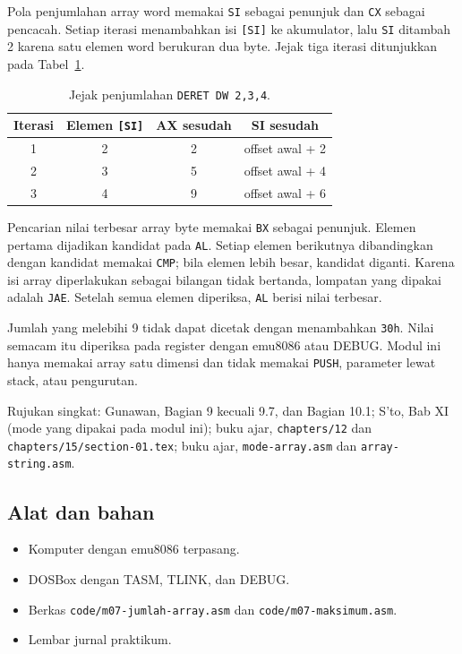 Pola penjumlahan array word memakai \texttt{SI} sebagai penunjuk dan
\texttt{CX} sebagai pencacah. Setiap iterasi menambahkan isi
\texttt{[SI]} ke akumulator, lalu \texttt{SI} ditambah 2 karena satu
elemen word berukuran dua byte. Jejak tiga iterasi ditunjukkan pada
Tabel~\ref{tab:m07-jejak}.

\begin{table}[H]
    \centering
    \caption{Jejak penjumlahan \texttt{DERET DW 2,3,4}.}
    \label{tab:m07-jejak}
    \small
    \begin{tabular}{@{}cccc@{}}
        \toprule
        \textbf{Iterasi} & \textbf{Elemen \texttt{[SI]}} &
        \textbf{AX sesudah} & \textbf{SI sesudah} \\
        \midrule
        1 & 2 & 2 & offset awal + 2 \\
        2 & 3 & 5 & offset awal + 4 \\
        3 & 4 & 9 & offset awal + 6 \\
        \bottomrule
    \end{tabular}
\end{table}

Pencarian nilai terbesar array byte memakai \texttt{BX} sebagai
penunjuk. Elemen pertama dijadikan kandidat pada \texttt{AL}. Setiap
elemen berikutnya dibandingkan dengan kandidat memakai
\texttt{CMP}; bila elemen lebih besar, kandidat diganti. Karena isi
array diperlakukan sebagai bilangan tidak bertanda, lompatan yang
dipakai adalah \texttt{JAE}. Setelah semua elemen diperiksa,
\texttt{AL} berisi nilai terbesar.

Jumlah yang melebihi 9 tidak dapat dicetak dengan menambahkan
\texttt{30h}. Nilai semacam itu diperiksa pada register dengan
emu8086 atau DEBUG. Modul ini hanya memakai array satu dimensi dan
tidak memakai \texttt{PUSH}, parameter lewat stack, atau pengurutan.

\begin{rujukan}
Rujukan singkat: Gunawan, Bagian 9 kecuali 9.7, dan Bagian 10.1;
S'to, Bab XI (mode yang dipakai pada modul ini); buku ajar,
\texttt{chapters/12} dan \texttt{chapters/15/section-01.tex};
buku ajar, \texttt{mode-array.asm} dan \texttt{array-string.asm}.
\end{rujukan}

\subsection{Alat dan bahan}

\begin{itemize}
    \item Komputer dengan emu8086 terpasang.
    \item DOSBox dengan TASM, TLINK, dan DEBUG.
    \item Berkas \texttt{code/m07-jumlah-array.asm} dan
          \texttt{code/m07-maksimum.asm}.
    \item Lembar jurnal praktikum.
\end{itemize}


